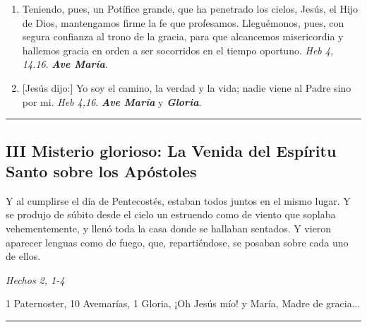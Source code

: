 \documentclass[11pt,a4paper]{book}
\begin{document}
\begin{enumerate}
        \item Teniendo, pues, un Potífice grande, que ha penetrado los cielos, Jesús, el Hijo de Dios, mantengamos firme la fe que profesamos. Lleguémonos, pues, 
            con segura confianza al trono de la gracia, para que alcancemos misericordia y hallemos gracia en orden a ser socorridos en el tiempo oportuno. 
            \emph{Heb 4, 14.16}. \textbf{\emph{Ave María}}.

        \item {[Jesús dijo:]} Yo soy el camino, la verdad y la vida; nadie viene al Padre sino por mi. \emph{Heb 4,16}. \textbf{\emph{Ave María}} y \textbf{\emph{Gloria}}.

    \end{enumerate}    

    \rule{\textwidth}{0.5pt}
    

    \subsection*{III Misterio glorioso: La Venida del Espíritu Santo sobre los Apóstoles}

    Y al cumplirse el día de Pentecostés, estaban todos juntos en el mismo lugar. Y se produjo de súbito desde el cielo un estruendo como de viento que soplaba vehementemente, 
    y llenó toda la casa donde se hallaban sentados. Y vieron aparecer lenguas como de fuego, que, repartiéndose, se posaban sobre cada uno de ellos. 

    \begin{flushright}
        \emph{Hechos 2, 1-4}
    \end{flushright}    

    1 Paternoster, 10 Avemarías, 1 Gloria, ¡Oh Jesús mío! y María, Madre de gracia...

    \rule{\textwidth}{0.5pt}
\end{document}
